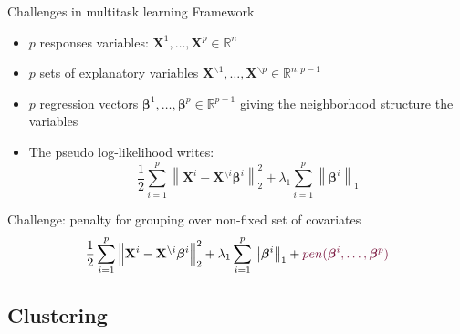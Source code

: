 \documentclass[11pt]{beamer}
\newcommand{\Xbf}{{\boldsymbol{X}}}
\begin{document}
\begin{frame}{Challenges in multitask learning}
	\textcolor{Framaprune}{Framework}
	\begin{itemize}
		\item $p$ responses variables: $\boldsymbol X^1, \dots, \boldsymbol X^p \in \mathbb R^{n}$ 
		\item $p$ sets of explanatory variables $\Xbf^{\backslash 1}, \dots, \Xbf^{\backslash p} \in \mathbb R^{n, p-1}$ 
		\item $p$ regression vectors $\boldsymbol \beta^1, \dots, \boldsymbol \beta^{p} \in \mathbb R^{p-1}$ giving the neighborhood structure the variables
		\item The pseudo log-likelihood writes:
		$$\frac{1}{2} \sum_{i=1}^p \left
		\lVert \mathbf{X}^i - \mathbf{X}^{\setminus i} \boldsymbol{\beta}^i \right
		\rVert_2 ^2  + \lambda_1 \sum_{i = 1}^p  \left \lVert \boldsymbol{\beta}^i
		\right \rVert_1$$
	\end{itemize}
	
	\textcolor{Framaprune}{Challenge: penalty for grouping over non-fixed set of covariates }
	$$\frac{1}{2} \sum_{i=1}^p \left
	\lVert \mathbf{X}^i - \mathbf{X}^{\setminus i} \boldsymbol{\beta}^i \right
	\rVert_2 ^2  + \lambda_1 \sum_{i = 1}^p  \left \lVert \boldsymbol{\beta}^i
	\right \rVert_1 + \textcolor{Framaprune}{pen(\boldsymbol{\beta}^i, \dots, \boldsymbol{\beta}^p)}$$
\end{frame}



\subsection{Clustering}
\end{document}
